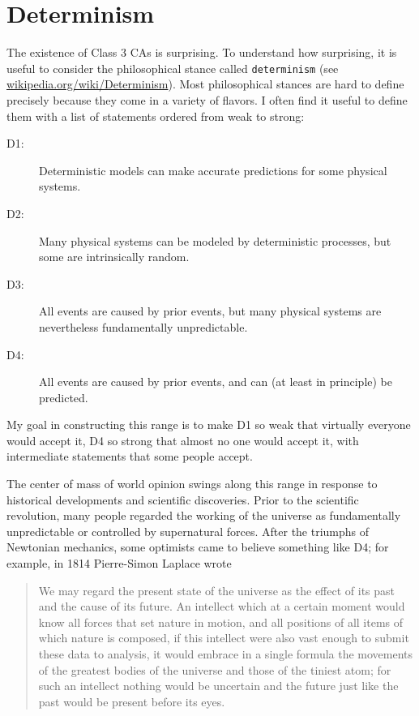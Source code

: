 \documentclass[10pt]{book}
\begin{document}
\section{Determinism}

The existence of Class 3 CAs is surprising.  To understand how
surprising, it is useful to consider the philosophical stance called
{\tt determinism} (see \url{wikipedia.org/wiki/Determinism}).
Most philosophical stances are hard to define precisely because
they come in a variety of flavors.  I often find it useful
to define them with a list of statements ordered from weak
to strong:

\begin{description}

\item[D1:] Deterministic models can make accurate predictions
for some physical systems.

\item[D2:] Many physical systems can be modeled by deterministic
processes, but some are intrinsically random.

\item[D3:] All events are caused by prior events, but many
physical systems are nevertheless fundamentally unpredictable.

\item[D4:] All events are caused by prior events, and can (at
least in principle) be predicted.

\end{description}

My goal in constructing this range is to make D1 so weak that
virtually everyone would accept it, D4 so strong that almost
no one would accept it, with intermediate statements that
some people accept.

The center of mass of world opinion swings along this
range in response to historical developments and scientific
discoveries.  Prior to the scientific revolution, many people
regarded the working of the universe as fundamentally unpredictable
or controlled by supernatural forces.  After the triumphs of
Newtonian mechanics, some optimists came to believe something
like D4; for example, in 1814 Pierre-Simon Laplace
wrote

\begin{quote}
We may regard the present state of the universe as the effect of its
past and the cause of its future. An intellect which at a certain
moment would know all forces that set nature in motion, and all
positions of all items of which nature is composed, if this intellect
were also vast enough to submit these data to analysis, it would
embrace in a single formula the movements of the greatest bodies of
the universe and those of the tiniest atom; for such an intellect
nothing would be uncertain and the future just like the past would be
present before its eyes.
\end{quote}
\end{document}
